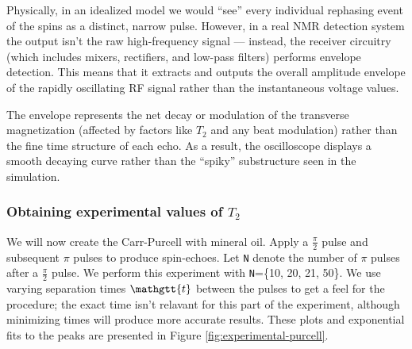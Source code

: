 \documentclass[
    floatfix,  %
    reprint,
    amsmath,amssymb,
    aps,
]{revtex4-2}
\newcommand{\halfpi}{\frac{\pi}{2}}
\newcommand{\taucode}{\mathgtt{t}}
\begin{document}
Physically, in an idealized model we would ``see'' every individual rephasing event of the spins as a distinct, narrow pulse. However, in a real NMR detection system the output isn't the raw high-frequency signal — instead, the receiver circuitry (which includes mixers, rectifiers, and low-pass filters) performs envelope detection. This means that it extracts and outputs the overall amplitude envelope of the rapidly oscillating RF signal rather than the instantaneous voltage values.

The envelope represents the net decay or modulation of the transverse magnetization (affected by factors like $T_2$ and any beat modulation) rather than the fine time structure of each echo. As a result, the oscilloscope displays a smooth decaying curve rather than the ``spiky'' substructure seen in the simulation.

\subsubsection{Obtaining experimental values of $T_2$}

We will now create the Carr-Purcell with mineral oil. Apply a $\halfpi$ pulse and subsequent $\pi$ pulses to produce spin-echoes. Let \texttt{N} denote the number of $\pi$ pulses after a $\halfpi$ pulse. We perform this experiment with \texttt{N}=\{10, 20, 21, 50\}. We use varying separation times $\taucode$ between the pulses to get a feel for the procedure; the exact time isn't relavant for this part of the experiment, although minimizing times will produce more accurate results. These plots and exponential fits to the peaks are presented in Figure \ref{fig:experimental-purcell}.
\end{document}
